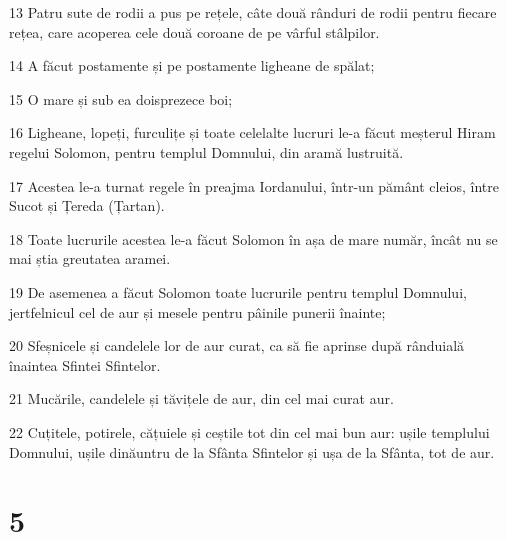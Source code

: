 \par 13 Patru sute de rodii a pus pe rețele, câte două rânduri de rodii pentru fiecare rețea, care acoperea cele două coroane de pe vârful stâlpilor.
\par 14 A făcut postamente și pe postamente ligheane de spălat;
\par 15 O mare și sub ea doisprezece boi;
\par 16 Ligheane, lopeți, furculițe și toate celelalte lucruri le-a făcut meșterul Hiram regelui Solomon, pentru templul Domnului, din aramă lustruită.
\par 17 Acestea le-a turnat regele în preajma Iordanului, într-un pământ cleios, între Sucot și Țereda (Țartan).
\par 18 Toate lucrurile acestea le-a făcut Solomon în așa de mare număr, încât nu se mai știa greutatea aramei.
\par 19 De asemenea a făcut Solomon toate lucrurile pentru templul Domnului, jertfelnicul cel de aur și mesele pentru pâinile punerii înainte;
\par 20 Sfeșnicele și candelele lor de aur curat, ca să fie aprinse după rânduială înaintea Sfintei Sfintelor.
\par 21 Mucările, candelele și tăvițele de aur, din cel mai curat aur.
\par 22 Cuțitele, potirele, cățuiele și ceștile tot din cel mai bun aur: ușile templului Domnului, ușile dinăuntru de la Sfânta Sfintelor și ușa de la Sfânta, tot de aur.

\chapter{5}

